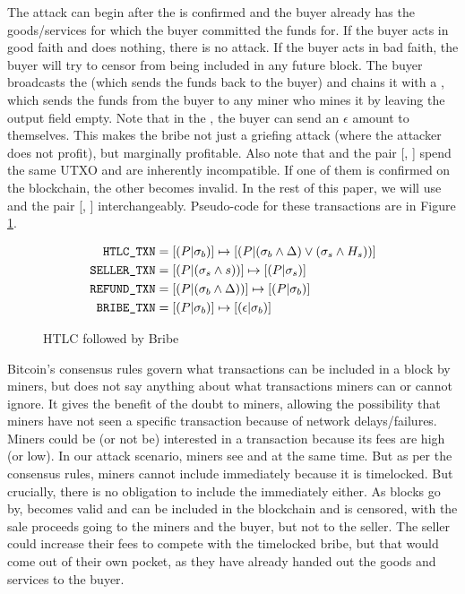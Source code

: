 The attack can begin after the \htlctxn{} is confirmed and the buyer already has the goods/services for which the buyer committed the funds for. If the buyer acts in good faith and does nothing, there is no attack. If the buyer acts in bad faith, the buyer will try to censor \sellertxn{} from being included in any future block. The buyer broadcasts the  (which sends the funds back to the buyer) and chains it with a \bribetxn{}, which sends the funds from the buyer to any miner who mines it by leaving the output field empty. Note that in the \bribetxn{}, the buyer can send an $\epsilon$ amount to themselves. This makes the bribe not just a griefing attack (where the attacker does not profit), but marginally profitable. Also note that \sellertxn{} and the pair [, \bribetxn{}] spend the same UTXO and are inherently incompatible. If one of them is confirmed on the blockchain, the other becomes invalid. In the rest of this paper, we will use \bribetxn{} and the pair [, \bribetxn{}] interchangeably. Pseudo-code for these transactions are in Figure \ref{fig:bribe_txn}.

\begin{figure}[!htb]
    \centering
    \caption{HTLC followed by Bribe}
    \label{fig:bribe_txn}
\begin{align*}
    \texttt{HTLC\_TXN}{} &= [(P|\sigma_b)] \mapsto [(P|(\sigma_b \land \Delta) \lor (\sigma_s \land H_{s}))] \\
    \texttt{SELLER\_TXN}{} &= [(P|(\sigma_s \land s))] \mapsto [(P|\sigma_s)] \\
    \texttt{REFUND\_TXN}{} &= [(P|(\sigma_b\land \Delta))] \mapsto [(P|\sigma_b)] \\
    \texttt{BRIBE\_TXN}{} &= [(P|\sigma_b)] \mapsto [(\epsilon|\sigma_b)]
\end{align*}
\end{figure}

Bitcoin's consensus rules govern what transactions can be included in a block by miners, but does not say anything about what transactions miners can or cannot ignore. It gives the benefit of the doubt to miners, allowing the possibility that miners have not seen a specific transaction because of network delays/failures. Miners could be (or not be) interested in a transaction because its fees are high (or low). In our attack scenario, miners see \sellertxn{} and \bribetxn{} at the same time. But as per the consensus rules, miners cannot include \bribetxn{} immediately because it is timelocked. But crucially, there is no obligation to include the \sellertxn{} immediately either. As blocks go by, \bribetxn{} becomes valid and can be included in the blockchain and  \sellertxn{} is censored, with the sale proceeds going to the miners and the buyer, but not to the seller. The seller could increase their fees to compete with the timelocked bribe, but that would come out of their own pocket, as they have already handed out the goods and services to the buyer.

